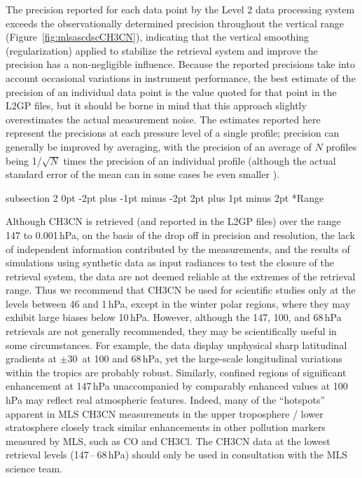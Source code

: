 \documentclass[11pt,draft]{report}
\makeatletter
\renewcommand{\subsection}{\@startsection%
  {subsection}%
  {2}%
  {0pt}%
  {-2pt plus -1pt minus -2pt}%
  {2pt plus 1pt minus 2pt}%
  {\large\sffamily\fontseries{sb}\selectfont\flushleft\color{SectionColor}\figureversion{tabular}}}%
\makeatother
\begin{document}
The precision reported for each data point by the Level 2 data
processing system exceeds the observationally determined precision
throughout the vertical range (Figure~\ref{fig:mlsascdscCH3CN}),
indicating that the vertical smoothing (regularization) applied to
stabilize the retrieval system and improve the precision has a
non-negligible influence. Because the reported precisions take into
account occasional variations in instrument performance, the best
estimate of the precision of an individual data point is the value
quoted for that point in the L2GP files, but it should be borne in
mind that this approach slightly overestimates the actual measurement
noise. The estimates reported here represent the precisions at each
pressure level of a single profile; precision can generally be
improved by averaging, with the precision of an average of $N$
profiles being 1/$\sqrt{N}$ times the precision of an individual
profile (although the actual standard error of the mean can in some
cases be even smaller \citep{TooheyAndVonClarmann13}).

\subsection*{Range}

Although CH\cs3CN is retrieved (and reported in the L2GP files) over the
range 147 to 0.001\,hPa, on the basis of the drop off in precision and
resolution, the lack of independent information contributed by the
measurements, and the results of simulations using synthetic data as
input radiances to test the closure of the retrieval system, the data
are not deemed reliable at the extremes of the retrieval range.  Thus we
recommend that \thisv CH\cs3CN be used for scientific studies only at
the levels between 46 and 1\,hPa, except in the winter polar regions,
where they may exhibit large biases below 10\,hPa.  However, although
the 147, 100, and 68\,hPa retrievals are not generally recommended, they
may be scientifically useful in some circumstances.  For example, the
data display unphysical sharp latitudinal gradients at $\pm$30\degsym\
at 100 and 68\,hPa, yet the large-scale longitudinal variations within
the tropics are probably robust.  Similarly, confined regions of
significant enhancement at 147\,hPa unaccompanied by comparably enhanced
values at 100\,hPa may reflect real atmospheric features.  Indeed, many
of the ``hotspots'' apparent in MLS CH\cs3CN measurements in the upper
troposphere / lower stratosphere closely track similar enhancements in
other pollution markers measured by MLS, such as CO and CH\cs3Cl.  The
\thisv CH\cs3CN data at the lowest retrieval levels (147\,--\,68\,hPa)
should only be used in consultation with the MLS science team.
\end{document}
